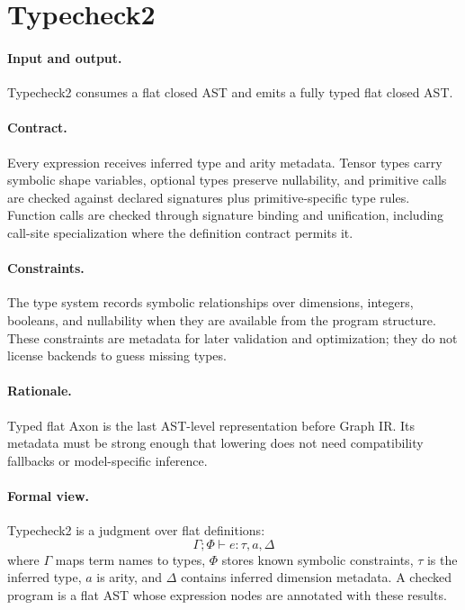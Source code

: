 \section{Typecheck2}

\paragraph{Input and output.}
Typecheck2 consumes a flat closed AST and emits a fully typed flat closed AST.

\paragraph{Contract.}
Every expression receives inferred type and arity metadata.  Tensor types carry
symbolic shape variables, optional types preserve nullability, and primitive
calls are checked against declared signatures plus primitive-specific type
rules.  Function calls are checked through signature binding and unification,
including call-site specialization where the definition contract permits it.

\paragraph{Constraints.}
The type system records symbolic relationships over dimensions, integers,
booleans, and nullability when they are available from the program structure.
These constraints are metadata for later validation and optimization; they do
not license backends to guess missing types.

\paragraph{Rationale.}
Typed flat Axon is the last AST-level representation before Graph IR.  Its
metadata must be strong enough that lowering does not need compatibility
fallbacks or model-specific inference.

\paragraph{Formal view.}
Typecheck2 is a judgment over flat definitions:
\[
  \Gamma;\Phi \vdash e : \tau, a, \Delta
\]
where \(\Gamma\) maps term names to types, \(\Phi\) stores known symbolic
constraints, \(\tau\) is the inferred type, \(a\) is arity, and \(\Delta\)
contains inferred dimension metadata.  A checked program is a flat AST whose
expression nodes are annotated with these results.

